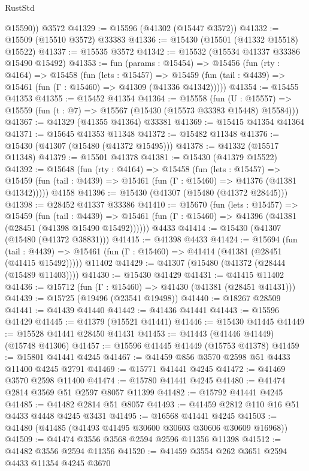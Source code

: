 \begin{lexlean}{RustStd}
\begin{coremodule}
        @15590))
    @3572
@41329 := @15596 (@41302 (@15447 @3572))
@41332 := @15509 (@15510 @3572) @33383
@41336 := @15430 (@15501 (@41332 @15518) @15522)
@41337 := @15535 @3572
@41342 := @15532 (@15534 @41337 @33386 @15490 @15492)
@41353 := fun (params : @15454) =>
  @15456
    (fun (rty : @4164) =>
    @15458
      (fun (lets : @15457) =>
      @15459 (fun (tail : @4439) => @15461 (fun (Γ : @15460) => @41309 (@41336 @41342)))))
@41354 := @15455 @41353
@41355 := @15452 @41354
@41364 := @15558
    (fun (U : @15557) => @15559 (fun (t : @7) => @15567 (@15430 (@15573 @33383 @15448) @15584)))
@41367 := @41329 (@41355 @41364) @33381
@41369 := @15415 @41354 @41364
@41371 := @15645 @41353 @11348
@41372 := @15482 @11348
@41376 := @15430 (@41307 (@15480 (@41372 @15495)))
@41378 := @41332 (@15517 @11348)
@41379 := @15501 @41378
@41381 := @15430 (@41379 @15522)
@41392 := @15648
    (fun (rty : @4164) =>
    @15458
      (fun (lets : @15457) =>
      @15459 (fun (tail : @4439) => @15461 (fun (Γ : @15460) => @41376 (@41381 @41342)))))
    @4158
@41396 := @15430 (@41307 (@15480 (@41372 @28445)))
@41398 := @28452 @41337 @33386
@41410 := @15670
    (fun (lets : @15457) =>
    @15459
      (fun (tail : @4439) =>
      @15461 (fun (Γ : @15460) => @41396 (@41381 (@28451 (@41398 @15490 @15492))))))
    @4433
@41414 := @15430 (@41307 (@15480 (@41372 @38831)))
@41415 := @41398 @4433
@41424 := @15694
    (fun (tail : @4439) => @15461 (fun (Γ : @15460) => @41414 (@41381 (@28451 (@41415 @15492)))))
    @11402
@41429 := @41307 (@15480 (@41372 (@28444 (@15489 @11403))))
@41430 := @15430 @41429
@41431 := @41415 @11402
@41436 := @15712 (fun (Γ : @15460) => @41430 (@41381 (@28451 @41431)))
@41439 := @15725 (@19496 (@23541 @19498))
@41440 := @18267 @28509
@41441 := @41439 @41440
@41442 := @41436 @41441
@41443 := @15596 @41429
@41445 := @41379 (@15521 @41441)
@41446 := @15430 @41445
@41449 := @15528 @41441 @28450 @41431
@41453 := @41443 (@41446 @41449) (@15748 @41306)
@41457 := @15596 @41445 @41449 (@15753 @41378)
@41459 := @15801 @41441 @4245
@41467 := @41459 @856 @3570 @2598 @51 @4433 @11400 @4245 @2791
@41469 := @15771 @41441 @4245
@41472 := @41469 @3570 @2598 @11400
@41474 := @15780 @41441 @4245
@41480 := @41474 @2814 @3569 @51 @2597 @8057 @11399
@41482 := @15792 @41441 @4245
@41485 := @41482 @2814 @51 @8057
@41493 := @41459 @2812 @110 @16 @51 @4433 @4448 @4245 @3431
@41495 := @16568 @41441 @4245
@41503 := @41480 (@41485 (@41493 @41495 @30600 @30603 @30606 @30609 @16968))
@41509 := @41474 @3556 @3568 @2594 @2596 @11356 @11398
@41512 := @41482 @3556 @2594 @11356
@41520 := @41459 @3554 @262 @3651 @2594 @4433 @11354 @4245 @3670

\end{coremodule}
\end{lexlean}
